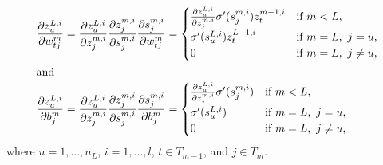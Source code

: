 \documentclass[12pt]{article}
\begin{document}
\begin{align}
\frac{\partial z^{L,i}_u}{\partial w^m_{tj}} &= \frac{\partial z^{L,i}_u}{\partial z^{m,i}_j} \frac{\partial z^{m,i}_j}{\partial s^{m,i}_j} \frac{\partial s^{m,i}_j}{\partial w^m_{tj}} = 
\begin{cases} 
\frac{\partial z^{L,i}_u}{\partial z^{m,i}_j} \sigma'(s^{m,i}_j) z^{m-1,i}_t &\text{if}\ m < L,\\
\sigma'(s^{L,i}_u) z^{L-1,i}_t &\text{if}\ m=L,\ j = u,\\
0 &\text{if}\ m=L,\ j \neq u,
\end{cases}\label{xtow-jaco}\\
\intertext{and} 
\frac{\partial z^{L,i}_u}{\partial b^m_{j}} &= \frac{\partial z^{L,i}_u}{\partial z^{m,i}_j} \frac{\partial z^{m,i}_j}{\partial s^{m,i}_j} \frac{\partial s^{m,i}_j}{\partial b^m_{j}} = 
\begin{cases}
\frac{\partial z^{L,i}_u}{\partial z^{m,i}_j} \sigma'(s^{m,i}_j) &\text{if}\ m < L,\\
\sigma'(s^{L,i}_u) &\text{if}\ m=L,\ j = u,\\
0 &\text{if}\ m=L,\ j \neq u,
\end{cases}
\label{xtow-jaco-bias}
\end{align}
where $u = 1,\ldots,n_L$, $i=1,\ldots,l$, $t \in T_{m-1}$, and $j \in T_m$. 
 
\end{document}

